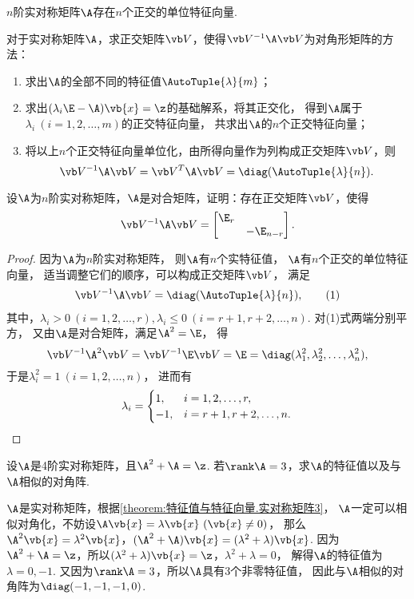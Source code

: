 \begin{corollary}
\(n\)阶实对称矩阵\(\A\)存在\(n\)个正交的单位特征向量.
\end{corollary}

\begin{remark}
\color{red}
对于实对称矩阵\(\A\)，求正交矩阵\(\Q\)，使得\(\Q^{-1}\A\Q\)为对角形矩阵的方法：
\begin{enumerate}
	\item 求出\(\A\)的全部不同的特征值\(\AutoTuple{\lambda}{m}\)；
	\item 求出\((\lambda_i\E-\A)\vb{x}=\z\)的基础解系，将其正交化，
	得到\(\A\)属于\(\lambda_i\ (i=1,2,\dotsc,m)\)的正交特征向量，
	共求出\(\A\)的\(n\)个正交特征向量；
	\item 将以上\(n\)个正交特征向量单位化，由所得向量作为列构成正交矩阵\(\Q\)，则\[
		\Q^{-1}\A\Q = \Q^T \A \Q = \diag(\AutoTuple{\lambda}{n}).
	\]
\end{enumerate}
\end{remark}

\begin{example}
设\(\A\)为\(n\)阶实对称矩阵，\(\A\)是对合矩阵，证明：存在正交矩阵\(\Q\)，使得\[
	\Q^{-1}\A\Q=\begin{bmatrix} \E_r \\ & -\E_{n-r} \end{bmatrix}.
\]
\begin{proof}
因为\(\A\)为\(n\)阶实对称矩阵，
则\(\A\)有\(n\)个实特征值，
\(\A\)有\(n\)个正交的单位特征向量，
适当调整它们的顺序，可以构成正交矩阵\(\Q\)，
满足\begin{gather}
	\Q^{-1}\A\Q=\diag(\AutoTuple{\lambda}{n}), \tag1
\end{gather}
其中，\(\lambda_i>0\ (i=1,2,\dotsc,r),
\lambda_i\leq0\ (i=r+1,r+2,\dotsc,n)\).
对(1)式两端分别平方，
又由\(\A\)是对合矩阵，满足\(\A^2=\E\)，
得\[
	\Q^{-1}\A^2\Q
	= \Q^{-1}\E\Q
	= \E
	= \diag(\lambda_1^2,\lambda_2^2,\dotsc,\lambda_n^2),
\]
于是\(\lambda_i^2=1\ (i=1,2,\dotsc,n)\)，
进而有\[
	\lambda_i= \begin{cases}
		1, & i=1,2,\dotsc,r, \\
		-1, & i=r+1,r+2,\dotsc,n.
	\end{cases}
	\qedhere
\]
\end{proof}
\end{example}

\begin{example}
设\(\A\)是4阶实对称矩阵，且\(\A^2+\A=\z\).
若\(\rank\A=3\)，求\(\A\)的特征值以及与\(\A\)相似的对角阵.
\begin{solution}
\(\A\)是实对称矩阵，根据\cref{theorem:特征值与特征向量.实对称矩阵3}，
\(\A\)一定可以相似对角化，不妨设\(\A\vb{x}=\lambda\vb{x}\ (\vb{x}\neq0)\)，
那么\(\A^2\vb{x}=\lambda^2\vb{x}\)，\((\A^2+\A)\vb{x}=(\lambda^2+\lambda)\vb{x}\).
因为\(\A^2+\A=\z\)，所以\((\lambda^2+\lambda)\vb{x}=\z\)，\(\lambda^2+\lambda=0\)，
解得\(\A\)的特征值为\(\lambda=0,-1\).
又因为\(\rank\A=3\)，所以\(\A\)具有3个非零特征值，
因此与\(\A\)相似的对角阵为\(\diag(-1,-1,-1,0)\).
\end{solution}
\end{example}

